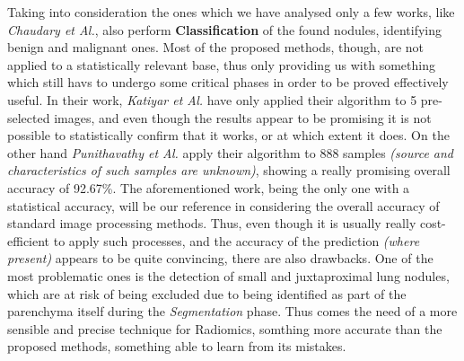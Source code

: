 \documentclass[../main.tex]{subfiles}
\begin{document}
Taking into consideration the ones which we have analysed only a few works, like \textit{Chaudary et Al.}\cite{Chaudhary2012}, also perform \textbf{Classification} of the found nodules, identifying benign and malignant ones.
Most of the proposed methods, though, are not applied to a statistically relevant base, thus only providing us with something which still havs to undergo some critical phases in order to be proved effectively useful. In their work, \textit{Katiyar et Al.} have only applied their algorithm to 5 pre-selected images, and even though the results appear to be promising it is not possible to statistically confirm that it works, or at which extent it does.\cite{Amutha2013} On the other hand \textit{Punithavathy et Al.} apply their algorithm to 888 samples \textit{(source and characteristics of such samples are unknown)}, showing a really promising overall accuracy of 92.67\%.\cite{Punithavathy2015} The aforementioned work, being the only one with a statistical accuracy, will be our reference in considering the overall accuracy of standard image processing methods.
Thus, even though it is usually really cost-efficient to apply such processes, and the accuracy of the prediction \textit{(where present)} appears to be quite convincing, there are also drawbacks. One of the most problematic ones is the detection of small and juxtaproximal lung nodules, which are at risk of being excluded due to being identified as part of the parenchyma itself during the \textit{Segmentation} phase. Thus comes the need of a more sensible and precise technique for Radiomics, somthing more accurate than the proposed methods, something able to learn from its mistakes. 
\end{document}

